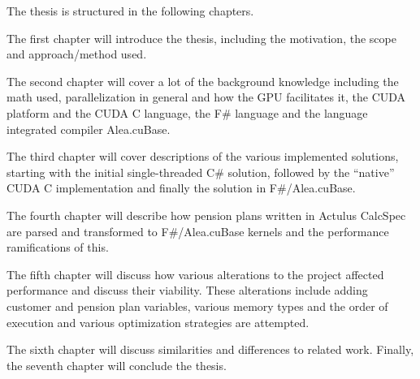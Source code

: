 The thesis is structured in the following chapters.

The first chapter will introduce the thesis, including the motivation, the scope and approach/method used.

The second chapter will cover a lot of the background knowledge including the math used, parallelization in general and how the GPU facilitates it, the CUDA platform and the CUDA C language, the F\# language and the language integrated compiler Alea.cuBase.

The third chapter will cover descriptions of the various implemented solutions, starting with the initial single-threaded C\# solution, followed by the ``native'' CUDA C implementation and finally the solution in F\#/Alea.cuBase.

The fourth chapter will describe how pension plans written in Actulus CalcSpec are parsed and transformed to F\#/Alea.cuBase kernels and the performance ramifications of this.

The fifth chapter will discuss how various alterations to the project affected performance and discuss their viability. These alterations include adding customer and pension plan variables, various memory types and the order of execution and various optimization strategies are attempted.

The sixth chapter will discuss similarities and differences to related work.
Finally, the seventh chapter will conclude the thesis.